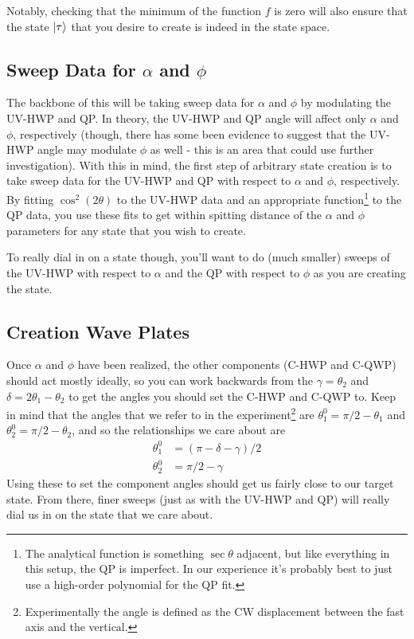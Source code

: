 \documentclass{paper}[11pt]
\begin{document}
	Notably, checking that the minimum of the function $f$ is zero will also ensure that the state $\ket{\tau}$ that you desire to create is indeed in the state space.
	
	\subsection{Sweep Data for $\alpha$ and $\phi$}
	The backbone of this will be taking sweep data for $\alpha$ and $\phi$ by modulating the UV-HWP and QP. In theory, the UV-HWP and QP angle will affect only $\alpha$ and $\phi$, respectively (though, there has some been evidence to suggest that the UV-HWP angle may modulate $\phi$ as well - this is an area that could use further investigation). With this in mind, the first step of arbitrary state creation is to take sweep data for the UV-HWP and QP with respect to $\alpha$ and $\phi$, respectively. By fitting $\cos^2(2\theta)$ to the UV-HWP data and an appropriate function\footnote{The analytical function is something $\sec\theta$ adjacent, but like everything in this setup, the QP is imperfect. In our experience it's probably best to just use a high-order polynomial for the QP fit.} to the QP data, you use these fits to get within spitting distance of the $\alpha$ and $\phi$ parameters for any state that you wish to create.
	
	To really dial in on a state though, you'll want to do (much smaller) sweeps of the UV-HWP with respect to $\alpha$ and the QP with respect to $\phi$ as you are creating the state.
	
	\subsection{Creation Wave Plates}
	Once $\alpha$ and $\phi$ have been realized, the other components (C-HWP and C-QWP) should act mostly ideally, so you can work backwards from the $\gamma=\theta_2$ and $\delta=2\theta_1-\theta_2$ to get the angles you should set the C-HWP and C-QWP to. Keep in mind that the angles that we refer to in the experiment\footnote{Experimentally the angle is defined as the CW displacement between the fast axis and the vertical.} are $\theta_1^0=\pi/2-\theta_1$ and $\theta_2^0=\pi/2-\theta_2$, and so the relationships we care about are
	\begin{align}
		\theta_1^0 &= (\pi - \delta - \gamma)/2\\
		\theta_2^0 &= \pi/2 - \gamma
	\end{align}
	Using these to set the component angles should get us fairly close to our target state. From there, finer sweeps (just as with the UV-HWP and QP) will really dial us in on the state that we care about.
	
\end{document}
